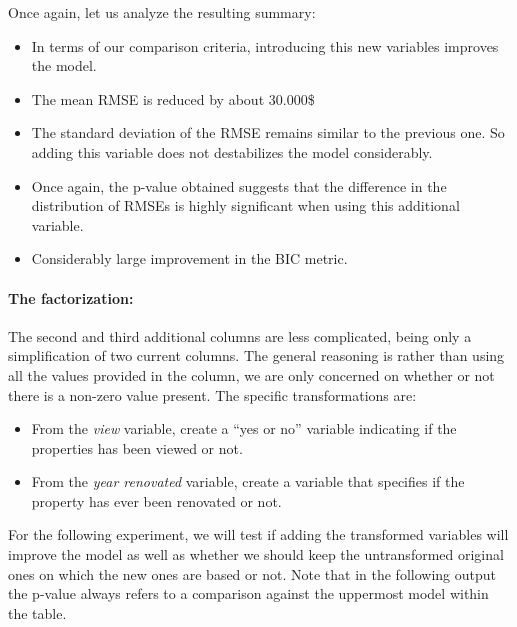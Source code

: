 \documentclass[table]{article}
\providecommand{\tightlist}{%
  \setlength{\itemsep}{0pt}\setlength{\parskip}{0pt}}
\let\oldparagraph\paragraph
\renewcommand{\paragraph}[1]{\oldparagraph{#1}\mbox{}}
\begin{document}
\hfill\break
Once again, let us analyze the resulting summary:

\begin{itemize}
\tightlist
\item
  In terms of our comparison criteria, introducing this new variables
  improves the model.
\item
  The mean RMSE is reduced by about 30.000\$
\item
  The standard deviation of the RMSE remains similar to the previous
  one. So adding this variable does not destabilizes the model
  considerably.
\item
  Once again, the p-value obtained suggests that the difference in the
  distribution of RMSEs is highly significant when using this additional
  variable.
\item
  Considerably large improvement in the BIC metric. \newpage
\end{itemize}

\paragraph{The factorization:}\label{the-factorization}

The second and third additional columns are less complicated, being only
a simplification of two current columns. The general reasoning is rather
than using all the values provided in the column, we are only concerned
on whether or not there is a non-zero value present. The specific
transformations are:

\begin{itemize}
\tightlist
\item
  From the \emph{view} variable, create a ``yes or no'' variable
  indicating if the properties has been viewed or not.
\item
  From the \emph{year renovated} variable, create a variable that
  specifies if the property has ever been renovated or not.
\end{itemize}

For the following experiment, we will test if adding the transformed
variables will improve the model as well as whether we should keep the
untransformed original ones on which the new ones are based or not. Note
that in the following output the p-value always refers to a comparison
against the uppermost model within the table. \hfill\break
\end{document}

